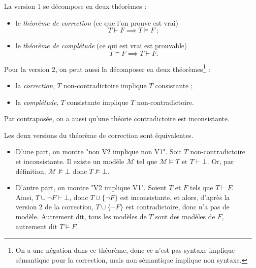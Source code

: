 \documentclass[./main]{subfiles}
\begin{document}
  \begin{rmk}
    La version 1 se décompose en deux théorèmes :
    \begin{itemize}
      \item le \textit{théorème de correction} (ce que l'on prouve est vrai)
        \[
        T \vdash F \implies T \models F\;
        ;\]
      \item le \textit{théorème de complétude} (ce qui est vrai est prouvable) \[
        T \models F \implies T\vdash F
        .\] 
    \end{itemize}

    Pour la version 2, on peut aussi la décomposer en deux théorèmes\footnote{On a une négation dans ce théorème, donc ce n'est pas syntaxe implique sémantique pour la correction, mais non sémantique implique non syntaxe.} :
    \begin{itemize}
      \item la \textit{correction}, $T$ non-contradictoire implique $T$ consistante ;
      \item la \textit{complétude}, $T$ consistante implique $T$ non-contradictoire.
    \end{itemize}
    Par contraposée, on a aussi qu'une théorie contradictoire est inconsistante.
  \end{rmk}

  \begin{prop}
    Les deux versions du théorème de correction sont équivalentes.
  \end{prop}
  \begin{prv}
    \begin{itemize}
      \item D'une part, on montre "non V2 implique non V1".
        Soit $T$ non-contradictoire et inconsistante.
        Il existe un modèle $\mathcal{M}$ tel que $\mathcal{M} \models T$ et $T \vdash \bot$.
        Or, par définition, $\mathcal{M} \not\models \bot$ donc $T \not\models \bot$.
      \item D'autre part, on montre "V2 implique V1".
        Soient $T$ et $F$ tels que $T \vdash F$.
        Ainsi, $T \cup \lnot F \vdash \bot$, donc $T \cup \{\lnot F\}$ est inconsistante, et alors, d'après la version 2 de la correction, $T \cup \{\lnot F\}$ est contradictoire, donc n'a pas de modèle.
        Autrement dit, tous les modèles de $T$ sont des modèles de $F$, autrement dit $T \models F$.
    \end{itemize}
  \end{prv}
\end{document}
